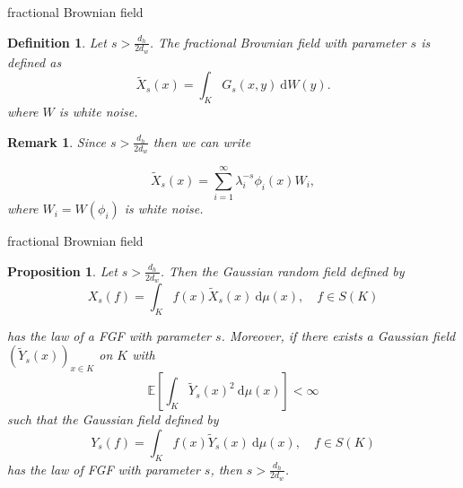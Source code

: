\documentclass{beamer}
\newtheorem{defi}[theorems]{Definition}
\newtheorem{prop}[theorems]{Proposition}
\newtheorem{remark}[theorems]{Remark}
\newcommand{\e}{\mathbb{E}}
\newcommand{\dd}{\ \text{d}}
\begin{document}
\begin{frame}{fractional Brownian field}
	
	\vspace{2em}
	\setcounter{theorems}{8}
	\begin{defi}
		Let $s > \frac{d_h}{2d_w}$. The \emph{fractional Brownian field} with parameter $s$ is defined as 
		\begin{equation}
			\widetilde{X}_s(x) = \int_{K} G_s(x,y)\dd W (y).
		\end{equation}
		where $W$ is white noise.
	\end{defi}
	
	\begin{remark}
		Since $s > \frac{d_h}{2d_w}$ then we can write
		
		\vspace{-1em}
		\begin{equation}
			\widetilde{X}_s(x) = \sum_{i = 1}^{\infty} \lambda_i^{-s}\phi_i(x)W_i,
		\end{equation}
		\vspace{-0.5em}
		where $W_i = W(\phi_i)$ is white noise.
	\end{remark}
\end{frame}

\begin{frame}{fractional Brownian field}
	
	\vspace{3em}
	\begin{prop}
		Let $s > \frac{d_h}{2d_w}$. Then the Gaussian random field defined by
				\vspace{-0.7em}
		\begin{equation}
			X_s(f) = \int_{K}f(x) \widetilde{X}_{s}(x) \dd \mu (x), \quad f \in S(K)
		\end{equation}
		
		\vspace{-0.7em}
		has the law of a FGF with parameter $s$. Moreover, if there exists a Gaussian field $\left(\widetilde{Y}_{s}(x)\right)_{x \in K}$ on $K$ with
			\vspace{-0.5em}
		\begin{equation}
			\e \left[\int_{K}\widetilde{Y}_s(x)^2 \dd \mu(x)\right] < \infty
		\end{equation}
				\vspace{-0.5em}
		such that the Gaussian field defined by
				\vspace{-0.5em}
		\begin{equation}
			Y_s(f) = \int_{K}f(x) \widetilde{Y}_{s}(x) \dd \mu (x), \quad f \in S(K)
		\end{equation}
		\vspace{-0.7em}
		has the law of FGF with parameter $s$, then $s > \frac{d_h}{2d_w}$.
	\end{prop}
\end{frame}
\end{document}
